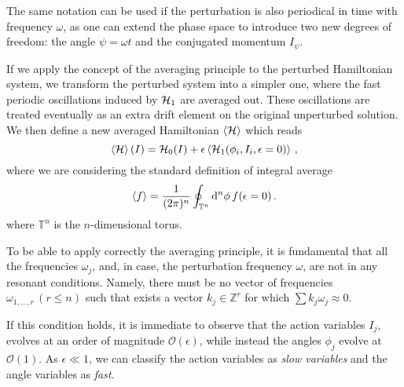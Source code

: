 The same notation can be used if the perturbation is also periodical in time with frequency $\omega$, as one can extend the phase space to introduce two new degrees of freedom: the angle $\psi=\omega t$ and the conjugated momentum $I_\psi$.

If we apply the concept of the averaging principle to the perturbed Hamiltonian system, we transform the perturbed system into a simpler one, where the fast periodic oscillations induced by $\mathcal{H}_1$ are averaged out. These oscillations are treated eventually as an extra drift element on the original unperturbed solution. We then define a new averaged Hamiltonian $\left<{\mathcal{H}}\right>$ which reads
%
\begin{equation} 
	\left<{\mathcal{H}}\right>(I) = \mathcal{H}_0(I)+\epsilon \left<{ \mathcal{H}_1(\phi_i, I_i, \epsilon=0) }\right>\,,
\end{equation}
%
where we are considering the standard definition of integral average
%
\begin{equation} 
	\left<{f}\right> = \frac{1}{(2\pi)^n}\oint_{\mathbb{T}^n}\dd^n\phi\, f(\epsilon=0) \, .
\end{equation}
%
where $\mathbb{T}^n$ is the $n$-dimensional torus.

To be able to apply correctly the averaging principle, it is fundamental that all the frequencies $\omega_j$, and, in case, the perturbation frequency $\omega$, are not in any resonant conditions. Namely, there must be no vector of frequencies $\omega_{1,\ldots,r}\,(r\leq n)$ such that exists a vector $k_j \in \mathbb{Z}^r$ for which $\sum k_j \omega_j \approx 0$.

If this condition holds, it is immediate to observe that the action variables $I_j$, evolves at an order of magnitude $\mathcal{O}(\epsilon)$, while instead the angles $\phi_j$ evolve at $\mathcal{O}(1)$. As $\epsilon \ll 1$, we can classify the action variables as \textit{slow variables} and the angle variables as \textit{fast}.

